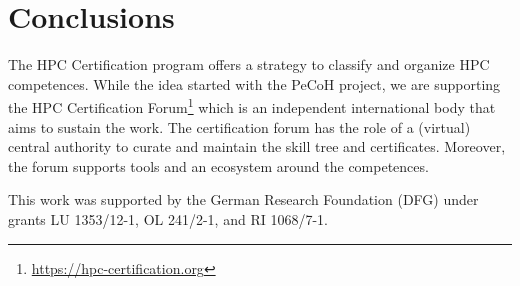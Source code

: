 \documentclass[jocse]{jocseart}
\begin{document}
\section{Conclusions}

The HPC Certification program offers a strategy to classify and organize HPC competences.
While the idea started with the PeCoH project, we are supporting the HPC Certification Forum\footnote{\url{https://hpc-certification.org}} which is an independent international body that aims to sustain the work.
The certification forum has the role of a (virtual) central authority to curate and maintain the skill tree and certificates.
Moreover, the forum supports tools and an ecosystem around the competences.


\appendix

\begin{acks}
\small
This work was supported by the German Research Foundation (DFG) under grants LU 1353/12-1, OL 241/2-1, and RI 1068/7-1.
\end{acks}



\end{document}
